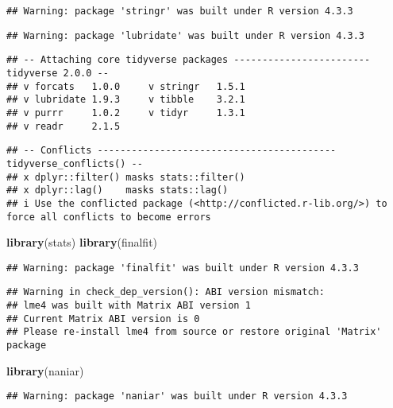 \documentclass[
]{article}
\newenvironment{Shaded}{\begin{snugshade}}{\end{snugshade}}
\newcommand{\FunctionTok}[1]{\textcolor[rgb]{0.13,0.29,0.53}{\textbf{#1}}}
\newcommand{\NormalTok}[1]{#1}
\begin{document}
\begin{verbatim}
## Warning: package 'stringr' was built under R version 4.3.3
\end{verbatim}

\begin{verbatim}
## Warning: package 'lubridate' was built under R version 4.3.3
\end{verbatim}

\begin{verbatim}
## -- Attaching core tidyverse packages ------------------------ tidyverse 2.0.0 --
## v forcats   1.0.0     v stringr   1.5.1
## v lubridate 1.9.3     v tibble    3.2.1
## v purrr     1.0.2     v tidyr     1.3.1
## v readr     2.1.5
\end{verbatim}

\begin{verbatim}
## -- Conflicts ------------------------------------------ tidyverse_conflicts() --
## x dplyr::filter() masks stats::filter()
## x dplyr::lag()    masks stats::lag()
## i Use the conflicted package (<http://conflicted.r-lib.org/>) to force all conflicts to become errors
\end{verbatim}

\begin{Shaded}
\begin{Highlighting}[]
\FunctionTok{library}\NormalTok{(stats)}
\FunctionTok{library}\NormalTok{(finalfit) }
\end{Highlighting}
\end{Shaded}

\begin{verbatim}
## Warning: package 'finalfit' was built under R version 4.3.3
\end{verbatim}

\begin{verbatim}
## Warning in check_dep_version(): ABI version mismatch: 
## lme4 was built with Matrix ABI version 1
## Current Matrix ABI version is 0
## Please re-install lme4 from source or restore original 'Matrix' package
\end{verbatim}

\begin{Shaded}
\begin{Highlighting}[]
\FunctionTok{library}\NormalTok{(naniar)}
\end{Highlighting}
\end{Shaded}

\begin{verbatim}
## Warning: package 'naniar' was built under R version 4.3.3
\end{verbatim}
\end{document}
